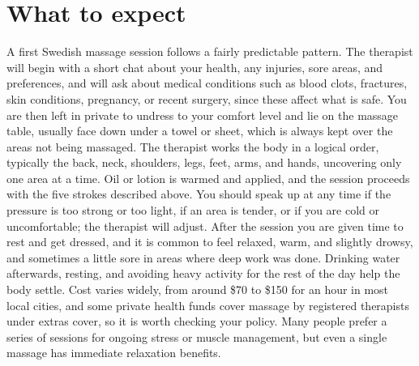 \section*{What to expect}
A first Swedish massage session follows a fairly predictable pattern. The therapist will begin with a short chat about your health, any injuries, sore areas, and preferences, and will ask about medical conditions such as blood clots, fractures, skin conditions, pregnancy, or recent surgery, since these affect what is safe. You are then left in private to undress to your comfort level and lie on the massage table, usually face down under a towel or sheet, which is always kept over the areas not being massaged. The therapist works the body in a logical order, typically the back, neck, shoulders, legs, feet, arms, and hands, uncovering only one area at a time. Oil or lotion is warmed and applied, and the session proceeds with the five strokes described above. You should speak up at any time if the pressure is too strong or too light, if an area is tender, or if you are cold or uncomfortable; the therapist will adjust. After the session you are given time to rest and get dressed, and it is common to feel relaxed, warm, and slightly drowsy, and sometimes a little sore in areas where deep work was done. Drinking water afterwards, resting, and avoiding heavy activity for the rest of the day help the body settle. Cost varies widely, from around \$70 to \$150 for an hour in most local cities, and some private health funds cover massage by registered therapists under extras cover, so it is worth checking your policy. Many people prefer a series of sessions for ongoing stress or muscle management, but even a single massage has immediate relaxation benefits.

